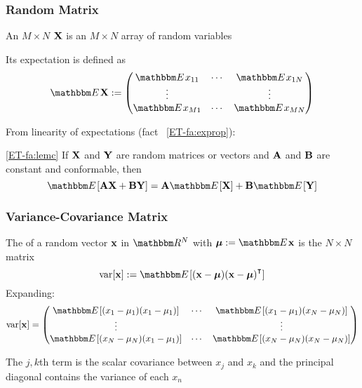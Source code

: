 \begin{frame}\frametitle{Random Matrix}

    \vspace{2em}
    An $M \times N$  $\mathbf X$ is an $M \times N$
    array of random variables
    
    Its expectation is defined as
    \begin{equation*}
        \EE \boldX
        := 
        \begin{pmatrix}
            \EE x_{11} & \cdots & \EE x_{1N} \\
            \vdots &  & \vdots \\
            \EE x_{M1} & \cdots & \EE x_{MN}
        \end{pmatrix}
    \end{equation*}
    
\end{frame}

\begin{frame}

    \vspace{2em}
    From linearity of expectations (fact ~\ref{ET-fa:exprop}):
    
    \Fact\eqref{ET-fa:lemc}
    If $\mathbf X$ and $\mathbf Y$ are random matrices or vectors and $\mathbf A$ and
    $\mathbf B$ are constant and conformable, then
    \begin{equation*}
        \EE [ \boldA \boldX + \boldB \boldY ]
            =  \boldA \EE [\boldX ] + \boldB \EE[\boldY]
    \end{equation*}

\end{frame}

\begin{frame}\frametitle{Variance-Covariance Matrix}

    \vspace{2em}
    The  of a random vector ${\mathbf x}$ in $\RR^N$ with 
    $\boldmu := \EE \boldx$ is the $N \times N$ matrix
    \begin{equation*}
        \label{eq:vcd1}
        \var [\boldx] := \EE [ (\boldx - \boldmu) (\boldx - \boldmu)^\T]
    \end{equation*}
    Expanding:
    \small
    \begin{equation*}
        \var [\boldx]
        = 
        \begin{pmatrix}
            \EE [(x_1 - \mu_1)(x_1 - \mu_1)]
                & \cdots & \EE [(x_1 - \mu_1)(x_N - \mu_N)] \\
            \vdots & & \vdots \\
            \EE [(x_N - \mu_N)(x_1 - \mu_1)]  
                & \cdots & \EE [(x_N - \mu_N)(x_N - \mu_N)] \\
        \end{pmatrix}
    \end{equation*}
    \normalsize
    
    The $j,k$th term is the scalar covariance between $x_j$ and $x_k$ and
    the principal diagonal contains the variance of each $x_n$
    
\end{frame}

